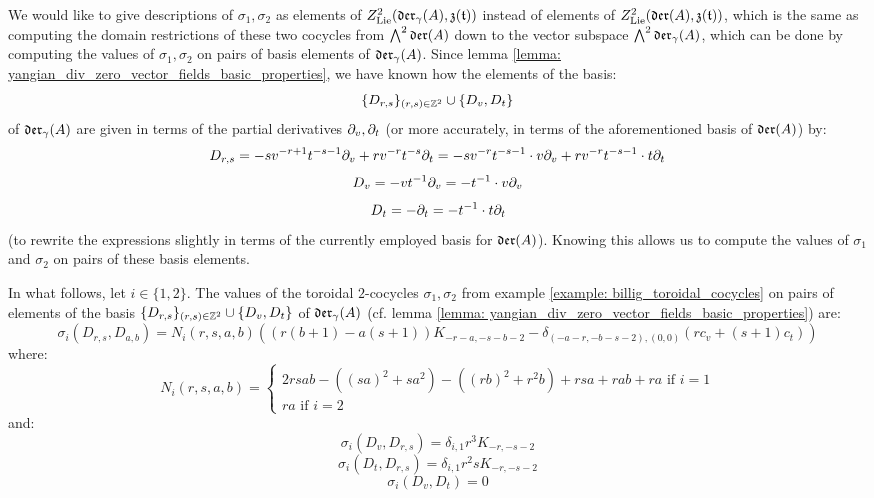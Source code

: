         We would like to give descriptions of $\sigma_1, \sigma_2$ as elements of $Z^2_{\mathrm{Lie}}(\mathfrak{der}_{\gamma}(A), \mathfrak{z}(\mathfrak{t}))$ instead of elements of $Z^2_{\mathrm{Lie}}(\mathfrak{der}(A), \mathfrak{z}(\mathfrak{t}))$, which is the same as computing the domain restrictions of these two cocycles from $\bigwedge^2 \mathfrak{der}(A)$ down to the vector subspace $\bigwedge^2 \mathfrak{der}_{\gamma}(A)$, which can be done by computing the values of $\sigma_1, \sigma_2$ on pairs of basis elements of $\mathfrak{der}_{\gamma}(A)$. Since lemma \ref{lemma: yangian_div_zero_vector_fields_basic_properties}, we have known how the elements of the  basis:
            $$\{D_{r, s}\}_{(r, s) \in \mathbb{Z}^2} \cup \{D_v, D_t\}$$
        of $\mathfrak{der}_{\gamma}(A)$ are given in terms of the partial derivatives $\partial_v, \partial_t$ (or more accurately, in terms of the aforementioned basis of $\mathfrak{der}(A)$) by:
            $$D_{r, s} = -s v^{-r + 1} t^{-s - 1} \partial_v + r v^{-r} t^{-s} \partial_t = -s v^{-r} t^{-s - 1} \cdot v\partial_v + r v^{-r} t^{-s - 1} \cdot t\partial_t$$
            $$D_v = -v t^{-1} \partial_v = -t^{-1} \cdot v\partial_v$$
            $$D_t = -\partial_t = -t^{-1} \cdot t\partial_t$$
        (to rewrite the expressions slightly in terms of the currently employed basis for $\mathfrak{der}(A)$). Knowing this allows us to compute the values of $\sigma_1$ and $\sigma_2$ on pairs of these basis elements.
        \begin{lemma} \label{lemma: billig_toroidal_cocycles_on_yangian_div_zero_vector_fields}
            In what follows, let $i \in \{1, 2\}$. The values of the toroidal $2$-cocycles $\sigma_1, \sigma_2$ from example \ref{example: billig_toroidal_cocycles} on pairs of elements of the basis $\{D_{r, s}\}_{(r, s) \in \mathbb{Z}^2} \cup \{D_v, D_t\}$ of $\mathfrak{der}_{\gamma}(A)$ (cf. lemma \ref{lemma: yangian_div_zero_vector_fields_basic_properties}) are:
                $$\sigma_i(D_{r, s}, D_{a, b}) = N_i(r, s, a, b) \left( ( r(b + 1) - a(s + 1) )K_{-r - a, -s - b - 2} - \delta_{ (-a - r, -b - s - 2), (0, 0) } (r c_v + (s + 1) c_t) \right)$$
            where:
                \begin{equation} \label{equation: billig_cocycles_coefficient}
                    N_i(r, s, a, b) =
                    \begin{cases}
                        \text{$2 rsab - ( (sa)^2 + s a^2 ) - ( (rb)^2 + r^2 b ) + rsa + rab + ra$ if $i = 1$}
                        \\
                        \text{$ra$ if $i = 2$}
                    \end{cases}
                \end{equation}
            and:
                $$\sigma_i(D_v, D_{r, s}) = \delta_{i, 1} r^3 K_{-r, -s - 2}$$
                $$\sigma_i(D_t, D_{r, s}) = \delta_{i, 1} r^2 s K_{-r, -s - 2}$$
                $$\sigma_i(D_v, D_t) = 0$$
        \end{lemma}

